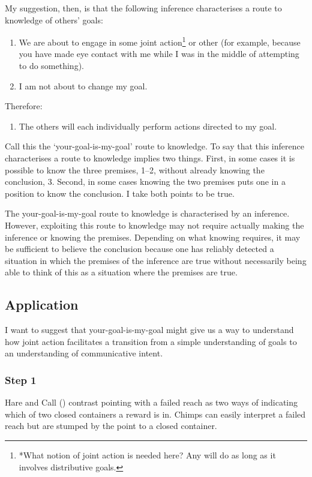 \documentclass[14pt,a4paper]{extarticle}
\begin{document}
My suggestion, then, is that the following inference characterises a route to knowledge of others’ goals:
%
\begin{enumerate}
\item We are about to engage in some joint action\footnote{
*What notion of joint action is needed here?  Any will do as long as it involves distributive goals.
}
or other (for example, because you have made eye contact with me while I was in the middle of attempting to do something).

\item I am not about to change my goal.

\end{enumerate}
%
Therefore:
%
\begin{enumerate}[resume]
%
\item The others will each individually perform actions directed to my goal.
\end{enumerate}
%
Call this the ‘your-goal-is-my-goal’ route to knowledge.  To say that this inference characterises a route to knowledge implies two things.  First, in some cases it is possible to know the three premises, 1–2, without already knowing the conclusion, 3.  Second, in some cases knowing the two premises puts one in a position to know the conclusion.  I take both points to be true.

The your-goal-is-my-goal route to knowledge is characterised by an inference.  However, exploiting this route to knowledge may not require actually making the inference or knowing the premises.  Depending on what knowing requires, it may be sufficient to believe the conclusion because one has reliably detected a situation in which the premises of the inference are true without necessarily being able to think of this as a situation where the premises are true.


\subsection{Application}
I want to suggest that your-goal-is-my-goal might give us a way to understand how joint action facilitates a transition from a simple understanding of goals to an understanding of communicative intent.

\subsubsection{Step 1}
Hare and Call (\citeyear{hare_chimpanzees_2004}) contrast pointing with a failed reach as two ways of indicating which of two closed containers a reward is in.  Chimps can easily interpret a failed reach but are stumped by the point to a closed container.
\end{document}

